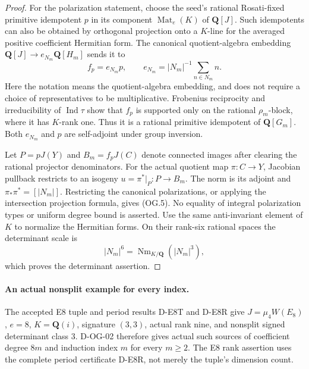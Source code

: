 \begin{proof}
For the polarization statement, choose the seed's rational
Rosati-fixed primitive idempotent $p$ in its component
$\operatorname{Mat}_e(K)$ of $\mathbf Q[J]$.
Such idempotents can also be obtained by orthogonal projection
onto a $K$-line for the averaged positive coefficient Hermitian
form.  The canonical quotient-algebra embedding
$\mathbf Q[J]\to e_{N_m}\mathbf Q[H_m]$ sends it to
\[
 f_p=e_{N_m}p,\qquad
 e_{N_m}=|N_m|^{-1}\sum_{n\in N_m}n.
 \tag{OG.8}
\]
Here the notation means the quotient-algebra embedding, and
does not require a choice of representatives to be multiplicative.
Frobenius reciprocity and irreducibility of
$\operatorname{Ind}\tau$ show that $f_p$ is supported only on
the rational $\rho_m$-block, where it has $K$-rank one.
Thus it is a rational primitive idempotent of $\mathbf Q[G_m]$.
Both $e_{N_m}$ and $p$ are self-adjoint under group inversion.

Let $P=pJ(Y)$ and $B_m=f_pJ(C)$ denote connected images after
clearing the rational projector denominators.  For the actual
quotient map $\pi:C\to Y$, Jacobian pullback restricts to an
isogeny $u=\pi^*|_P:P\to B_m$.  The norm is its adjoint and
$\pi_*\pi^*=[|N_m|]$.  Restricting the canonical polarizations,
or applying the intersection projection formula, gives (OG.5).
No equality of integral polarization types or uniform degree
bound is asserted.  Use the same anti-invariant element of $K$
to normalize the Hermitian forms.  On their rank-six rational
spaces the determinant scale is
\[
 |N_m|^6=\operatorname{Nm}_{K/\mathbf Q}(|N_m|^3),
 \tag{OG.9}
\]
which proves the determinant assertion.
\end{proof}

\paragraph{An actual nonsplit example for every index.}
The accepted E8 tuple and period results D-E8T and D-E8R give
$J=\mu_4W(E_8)$, $e=8$, $K=\mathbf Q(i)$, signature $(3,3)$,
actual rank nine, and nonsplit signed determinant class $3$.
D-OG-02 therefore gives actual such sources of coefficient
degree $8m$ and induction index $m$ for every $m\ge2$.
The E8 rank assertion uses the complete period certificate
D-E8R, not merely the tuple's dimension count.

